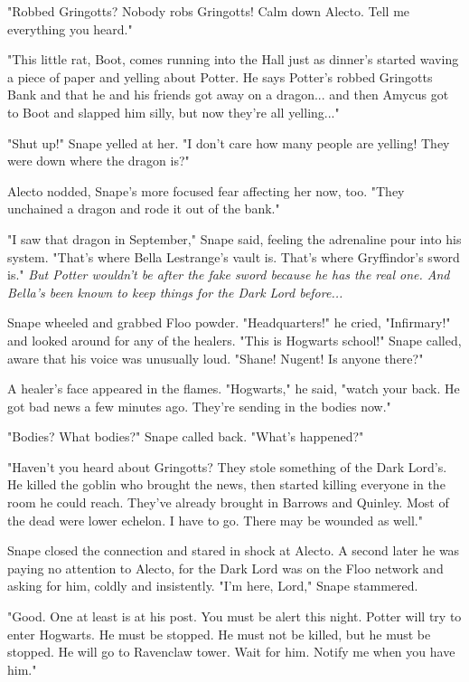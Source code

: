 \documentclass[a4paper,11pt]{article}
\begin{document}
"Robbed Gringotts? Nobody robs Gringotts! Calm down Alecto. Tell me everything you heard."

"This little rat, Boot, comes running into the Hall just as dinner's started waving a piece of paper and yelling about Potter. He says Potter's robbed Gringotts Bank and that he and his friends got away on a dragon... and then Amycus got to Boot and slapped him silly, but now they're all yelling..."

"Shut up!" Snape yelled at her. "I don't care how many people are yelling! They were down where the dragon is?"

Alecto nodded, Snape's more focused fear affecting her now, too. "They unchained a dragon and rode it out of the bank."

"I saw that dragon in September," Snape said, feeling the adrenaline pour into his system. "That's where Bella Lestrange's vault is. That's where Gryffindor's sword is." \emph{But Potter wouldn't be after the fake sword because he has the real one. And Bella's been known to keep things for the Dark Lord before...}

Snape wheeled and grabbed Floo powder. "Headquarters!" he cried, "Infirmary!" and looked around for any of the healers. "This is Hogwarts school!" Snape called, aware that his voice was unusually loud. "Shane! Nugent! Is anyone there?"

A healer's face appeared in the flames. "Hogwarts," he said, "watch your back. He got bad news a few minutes ago. They're sending in the bodies now."

"Bodies? What bodies?" Snape called back. "What's happened?"

"Haven't you heard about Gringotts? They stole something of the Dark Lord's. He killed the goblin who brought the news, then started killing everyone in the room he could reach. They've already brought in Barrows and Quinley. Most of the dead were lower echelon. I have to go. There may be wounded as well."

Snape closed the connection and stared in shock at Alecto. A second later he was paying no attention to Alecto, for the Dark Lord was on the Floo network and asking for him, coldly and insistently. "I'm here, Lord," Snape stammered.

"Good. One at least is at his post. You must be alert this night. Potter will try to enter Hogwarts. He must be stopped. He must not be killed, but he must be stopped. He will go to Ravenclaw tower. Wait for him. Notify me when you have him."
\end{document}
